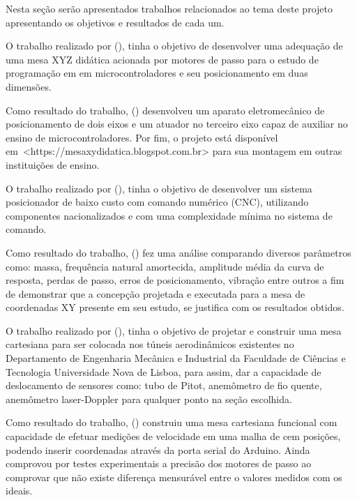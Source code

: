 Nesta seção serão apresentados trabalhos relacionados ao tema deste projeto apresentando os objetivos e resultados 
de cada um.

O trabalho realizado por \citeauthor{butignol2017adequaccao} (\citeyear{butignol2017adequaccao}), tinha o objetivo de desenvolver uma adequação de uma mesa XYZ didática 
acionada por motores de passo para o estudo de programação em em microcontroladores e seu posicionamento em duas 
dimensões.

Como resultado do trabalho, \citeauthor{butignol2017adequaccao} (\citeyear{butignol2017adequaccao}) 
desenvolveu um aparato eletromecânico de posicionamento de dois eixos e um atuador no terceiro eixo 
capaz de auxiliar no ensino de microcontroladores. Por fim, o projeto está disponível 
em~<https://mesaxydidatica.blogspot.com.br> para sua montagem em outras instituições de ensino.

O trabalho realizado por \citeauthor{camargo1988mesa} (\citeyear{camargo1988mesa}), tinha o objetivo de desenvolver um sistema posicionador de baixo custo 
com comando numérico (CNC), utilizando componentes nacionalizados e com uma complexidade mínima no sistema de comando.

Como resultado do trabalho, \citeauthor{camargo1988mesa} (\citeyear{camargo1988mesa}) fez uma análise comparando diversos parâmetros como: massa, frequência 
natural amortecida, amplitude média da curva de resposta, perdas de passo, erros de posicionamento, vibração entre 
outros a fim de demonstrar que a concepção projetada e executada para a mesa de coordenadas XY presente em seu estudo, 
se justifica com os resultados obtidos.

O trabalho realizado por \citeauthor{ramos2018desenvolvimento} (\citeyear{ramos2018desenvolvimento}), tinha o objetivo de projetar e construir uma mesa cartesiana para ser colocada 
nos túneis aerodinâmicos existentes no Departamento de Engenharia Mecânica e Industrial da Faculdade de Ciências e 
Tecnologia Universidade Nova de Lisboa, para assim, dar a capacidade de deslocamento de sensores como: tubo de Pitot, 
anemômetro de fio quente, anemômetro laser-Doppler para qualquer ponto na seção escolhida.

Como resultado do trabalho, \citeauthor{ramos2018desenvolvimento} (\citeyear{ramos2018desenvolvimento}) construiu uma mesa cartesiana funcional com capacidade de efetuar medições 
de velocidade em uma malha de cem posições, podendo inserir coordenadas através da porta serial do Arduino. Ainda 
comprovou por testes experimentais a precisão dos motores de passo ao comprovar que não existe diferença mensurável 
entre o valores medidos com os ideais.

